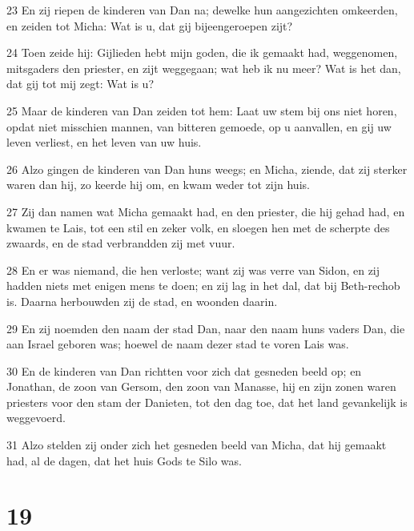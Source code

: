 \par 23 En zij riepen de kinderen van Dan na; dewelke hun aangezichten omkeerden, en zeiden tot Micha: Wat is u, dat gij bijeengeroepen zijt?
\par 24 Toen zeide hij: Gijlieden hebt mijn goden, die ik gemaakt had, weggenomen, mitsgaders den priester, en zijt weggegaan; wat heb ik nu meer? Wat is het dan, dat gij tot mij zegt: Wat is u?
\par 25 Maar de kinderen van Dan zeiden tot hem: Laat uw stem bij ons niet horen, opdat niet misschien mannen, van bitteren gemoede, op u aanvallen, en gij uw leven verliest, en het leven van uw huis.
\par 26 Alzo gingen de kinderen van Dan huns weegs; en Micha, ziende, dat zij sterker waren dan hij, zo keerde hij om, en kwam weder tot zijn huis.
\par 27 Zij dan namen wat Micha gemaakt had, en den priester, die hij gehad had, en kwamen te Lais, tot een stil en zeker volk, en sloegen hen met de scherpte des zwaards, en de stad verbrandden zij met vuur.
\par 28 En er was niemand, die hen verloste; want zij was verre van Sidon, en zij hadden niets met enigen mens te doen; en zij lag in het dal, dat bij Beth-rechob is. Daarna herbouwden zij de stad, en woonden daarin.
\par 29 En zij noemden den naam der stad Dan, naar den naam huns vaders Dan, die aan Israel geboren was; hoewel de naam dezer stad te voren Lais was.
\par 30 En de kinderen van Dan richtten voor zich dat gesneden beeld op; en Jonathan, de zoon van Gersom, den zoon van Manasse, hij en zijn zonen waren priesters voor den stam der Danieten, tot den dag toe, dat het land gevankelijk is weggevoerd.
\par 31 Alzo stelden zij onder zich het gesneden beeld van Micha, dat hij gemaakt had, al de dagen, dat het huis Gods te Silo was.

\chapter{19}

